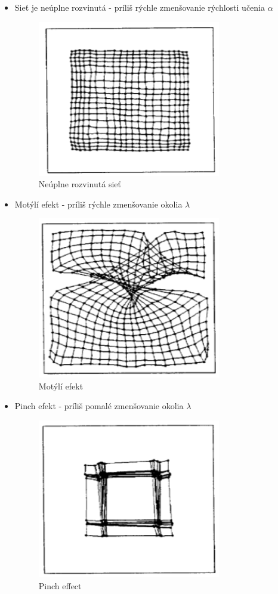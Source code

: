 \begin{itemize}
	\item Sieť je neúplne rozvinutá - príliš rýchle zmenšovanie rýchlosti učenia $\alpha$
	\begin{figure}[H]
		\centering
		\includegraphics[width=8cm]{assets/too_fast}
		\caption{Neúplne rozvinutá sieť}
	\end{figure}
	
	\item Motýlí efekt - príliš rýchle zmenšovanie okolia $\lambda$
	\begin{figure}[H]
		\centering
		\includegraphics[width=8cm]{assets/butterfly_effect}
		\caption{Motýlí efekt}
	\end{figure}
	
	\item Pinch efekt - príliš pomalé zmenšovanie okolia $\lambda$
	\begin{figure}[H]
		\centering
		\includegraphics[width=8cm]{assets/pinch_effect}
		\caption{Pinch effect}
	\end{figure}
\end{itemize}

